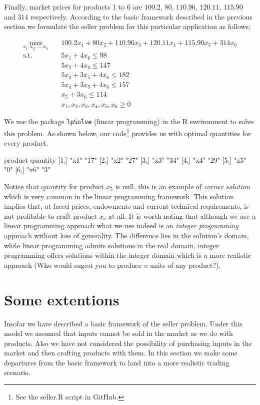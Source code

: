\documentclass[12pt]{article}         %
\begin{document}
Finally, market prices for products 1 to 6 are $100.2$, $80$, $110.96$, $120.11$, $115.90$ and $314$ respectively. According to the basic framework described in the previous section we formulate the seller problem for this particular application as follows:

\begin{equation}
\begin{aligned}
\max_{x_1,x_2,...,x_n} \quad & 100.2x_1 + 80x_2 + 110.96x_3 + 120.11x_4 + 115.90x_5 + 314x_6 \\
\textrm{s.t.} \quad & 5x_1 + 4x_6 \leq 98\\
  & 5x_2 + 4x_6 \leq 147\\
  & 5x_3 + 3x_5 + 4x_6 \leq 182\\
  & 5x_4 + 3x_5 + 4x_6 \leq 157\\
  & x_5 + 3x_6 \leq 114\\
  & x_1,x_2,x_3,x_4,x_5,x_6 \geq 0
\end{aligned}
\end{equation}

We use the package \texttt{lpSolve} (linear programming) in the R environment to solve this problem. As shown below, our code\footnote{See the seller.R script in GitHub.} provides us with optimal quantities for every product.

\begin{Schunk}
\begin{Soutput}
     product quantity
[1,] "x1"    "17"    
[2,] "x2"    "27"    
[3,] "x3"    "34"    
[4,] "x4"    "29"    
[5,] "x5"    "0"     
[6,] "x6"    "3"     
\end{Soutput}
\end{Schunk}

\newpage

Notice that quantity for product $x_5$ is null, this is an example of \textit{corner solution} which is very common in the linear programming framework. This solution implies that, at faced prices, endowments and current technical requirements, is not profitable to craft product $x_5$ at all. It is worth noting that although we use a linear programming approach what we use indeed is an \textit{integer programming} approach without loss of generality. The difference lies in the solution's domain, while linear programming admits solutions in the real domain, integer programming offers solutions within the integer domain which is a more realistic approach (Who would sugest you to produce $\pi$ units of any product?).

\section{Some extentions}
Insofar we have described a basic framework of the seller problem. Under this model we assumed that inputs cannot be sold in the market as we do with products. Also we have not considered the possibility of purchasing inputs in the market and then crafting products with them. In this section we make some departures from the basic framework to land into a more realistic trading scenario.
\end{document}
